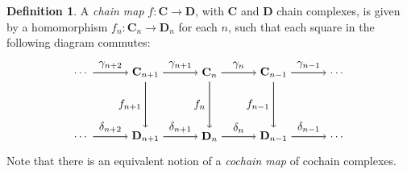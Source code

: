 \documentclass[11.5pt, twoside, a4paper, titlepage]{report}
\theoremstyle{definition}
\newtheorem{mydef}{Definition}[section]
\theoremstyle{plain}
\begin{document}
\begin{mydef}
A \emph{chain map}  $f: \mathbf{C} \to \mathbf{D}$, with $\mathbf{C}$ and $\mathbf{D}$ chain complexes, is given by a homomorphism $f_n: \mathbf{C}_n \to \mathbf{D}_n$ for each $n$, such that each square in the following diagram commutes:
\begin{equation*}
\begin{tikzpicture}[->,-latex, auto, every path/.style={->, semithick}, main node/.style={}]
\node	[main node]		(1) at (0,0)		{\dots};
\node	[main node]		(2) at (2,0)		{$\mathbf{C}_{n+1}$};
\node	[main node]		(3) at (4,0)		{$\mathbf{C}_{n}$};
\node [main node]		(4) at (6,0)		{$\mathbf{C}_{n-1}$};
\node [main node]		(5) at (8,0)		{$\dots$};
\node	[main node]		(6) at (0,-2)		{\dots};
\node	[main node]		(7) at (2,-2)		{$\mathbf{D}_{n+1}$};
\node	[main node]		(8) at (4,-2)		{$\mathbf{D}_{n}$};
\node [main node]		(9) at (6,-2)		{$\mathbf{D}_{n-1}$};
\node [main node]		(10) at (8,-2)		{\dots};

\draw (1) edge node [auto] {$\gamma_{n+2}$} (2);
\draw (2) edge node [auto] {$\gamma_{n+1}$} (3);
\draw (3) edge node [auto] {$\gamma_n$} (4);
\draw (4) edge node [auto] {$\gamma_{n-1}$} (5);
\draw (6) edge node [auto] {$\delta_{n+2}$} (7);
\draw (7) edge node [auto] {$\delta_{n+1}$} (8);
\draw (8) edge node [auto] {$\delta_n$} (9);
\draw (9) edge node [auto] {$\delta_{n-1}$} (10);
\draw (2) edge node [auto, swap] {$f_{n+1}$} (7);
\draw (3) edge node [auto, swap] {$f_n$} (8);
\draw (4) edge node [auto, swap] {$f_{n-1}$} (9);
\end{tikzpicture}
\end{equation*}
Note that there is an equivalent notion of a \emph{cochain map} of cochain complexes.
\end{mydef}
\end{document}
